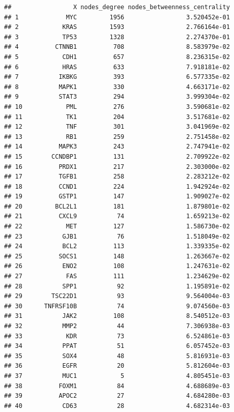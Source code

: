 \documentclass[
]{article}
\begin{document}
\begin{verbatim}
##                 X nodes_degree nodes_betweenness_centrality
## 1             MYC         1956                 3.520452e-01
## 2            KRAS         1593                 2.766164e-01
## 3            TP53         1328                 2.274370e-01
## 4          CTNNB1          708                 8.583979e-02
## 5            CDH1          657                 8.236315e-02
## 6            HRAS          633                 7.918181e-02
## 7           IKBKG          393                 6.577335e-02
## 8           MAPK1          330                 4.663171e-02
## 9           STAT3          294                 3.999304e-02
## 10            PML          276                 3.590681e-02
## 11            TK1          204                 3.517681e-02
## 12            TNF          301                 3.041969e-02
## 13            RB1          259                 2.751458e-02
## 14          MAPK3          243                 2.747941e-02
## 15        CCNDBP1          131                 2.709922e-02
## 16          PRDX1          217                 2.303000e-02
## 17          TGFB1          258                 2.283212e-02
## 18          CCND1          224                 1.942924e-02
## 19          GSTP1          147                 1.909027e-02
## 20         BCL2L1          181                 1.879801e-02
## 21          CXCL9           74                 1.659213e-02
## 22            MET          127                 1.586730e-02
## 23           GJB1           76                 1.518049e-02
## 24           BCL2          113                 1.339335e-02
## 25          SOCS1          148                 1.263667e-02
## 26           ENO2          108                 1.247631e-02
## 27            FAS          111                 1.234629e-02
## 28           SPP1           92                 1.195891e-02
## 29        TSC22D1           93                 9.564004e-03
## 30      TNFRSF10B           74                 9.074560e-03
## 31           JAK2          108                 8.540512e-03
## 32           MMP2           44                 7.306938e-03
## 33            KDR           73                 6.524861e-03
## 34           PPAT           51                 6.057452e-03
## 35           SOX4           48                 5.816931e-03
## 36           EGFR           20                 5.812604e-03
## 37           MUC1            5                 4.805451e-03
## 38          FOXM1           84                 4.688689e-03
## 39          APOC2           27                 4.684280e-03
## 40           CD63           28                 4.682314e-03

\end{verbatim}
\end{document}
